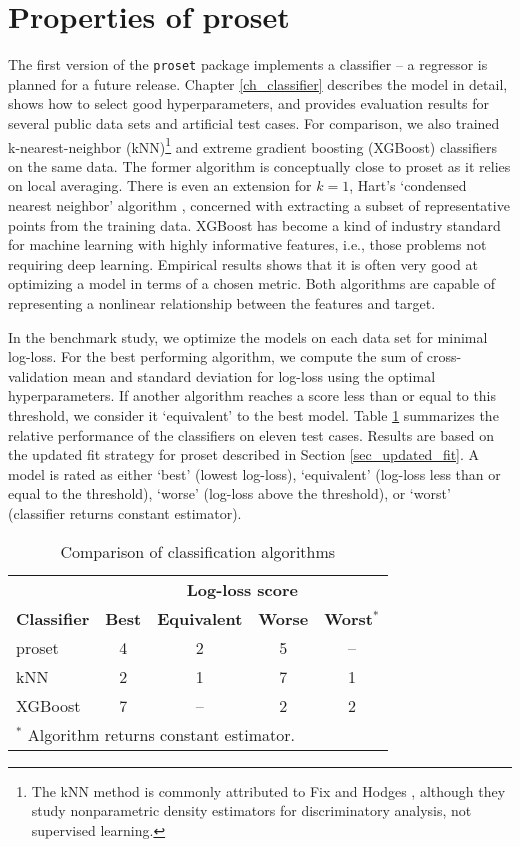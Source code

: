\section{Properties of proset}
\label{sec_properties}
%
The first version of the \texttt{proset} package implements a classifier -- a regressor is planned for a future release.
Chapter \ref{ch_classifier} describes the model in detail, shows how to select good hyperparameters, and provides evaluation results for several public data sets and artificial test cases.
For comparison, we also trained k-nearest-neighbor (kNN)\footnote{
The kNN method is commonly attributed to Fix and Hodges \cite{Fix_51}, although they study nonparametric density estimators for discriminatory analysis, not supervised learning.
}
and extreme gradient boosting (XGBoost) \cite{Chen_16} classifiers on the same data.
The former algorithm is conceptually close to proset as it relies on local averaging.
There is even an extension for $k=1$, Hart's `condensed nearest neighbor' algorithm \cite{Hart_68}, concerned with extracting a subset of representative points from the training data.
XGBoost has become a kind of industry standard for machine learning with highly informative features, i.e., those problems not requiring deep learning.
Empirical results shows that it is often very good at optimizing a model in terms of a chosen metric.
Both algorithms are capable of representing a nonlinear relationship between the features and target.\par
%
In the benchmark study, we optimize the models on each data set for minimal log-loss.
For the best performing algorithm, we compute the sum of cross-validation mean and standard deviation for log-loss using the optimal hyperparameters.
If another algorithm reaches a score less than or equal to this threshold, we consider it `equivalent' to the best model.
Table \ref{tab_classifier_comparison} summarizes the relative performance of the classifiers on eleven test cases.
Results are based on the updated fit strategy for proset described in Section \ref{sec_updated_fit}.
A model is rated as either `best' (lowest log-loss), `equivalent' (log-loss less than or equal to the threshold), `worse' (log-loss above the threshold), or `worst' (classifier returns constant estimator).
\par
%
\begin{table}
\caption{Comparison of classification algorithms}
\label{tab_classifier_comparison}
%
\begin{center}
\begin{tabular}{|lcccc|}
\hline
&\multicolumn{4}{c|}{\textbf{Log-loss score}}\\
\textbf{Classifier}&\textbf{Best}&\textbf{Equivalent}&\textbf{Worse}&\textbf{Worst$^*$}\\
proset&4&2&5&--\\
kNN&2&1&7&1\\
XGBoost&7&--&2&2\\
\multicolumn{5}{|l|}{$^*$ Algorithm returns constant estimator.}\\
\hline
\end{tabular}
\end{center}
\end{table}
